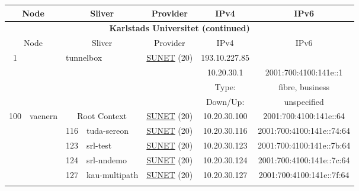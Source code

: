 \begin{small}
\begin{center}
\begin{longtable}{|c|c|c|c|c|c|c|c|}
 \multicolumn{2}{|p{8em}|}{Node} & \multicolumn{2}{|p{8em}|}{Sliver} & \multicolumn{2}{|p{8em}|}{Provider} & IPv4 & IPv6 \\ \hline
\endfirsthead
\hline
 \multicolumn{8}{|c|}{\textbf{Karlstads Universitet (continued)}} \\ \hline
 \multicolumn{2}{|p{8em}|}{Node} & \multicolumn{2}{|p{8em}|}{Sliver} & \multicolumn{2}{|p{8em}|}{Provider} & IPv4 & IPv6 \\ \hline
\endhead
 \multirow{4}{*}{\tiny{1}} & \multicolumn{3}{|c|}{\multirow{4}{*}{\tiny{tunnelbox}}} & \multicolumn{2}{|c|}{\multirow{4}{*}{\tiny{\href{http://www.sunet.se}{SUNET} (20)}}} & \tiny{193.10.227.85} & \frownie{} \\* \cline{7-7}\cline{8-8}
  & \multicolumn{3}{|c|}{} & \multicolumn{2}{|c|}{} & \tiny{10.20.30.1} & \tiny{2001:700:4100:141e::1} \\* \cline{7-7}\cline{8-8}
  & \multicolumn{3}{|c|}{} & \multicolumn{2}{|c|}{} & Type: & fibre, business \\* \cline{7-7}\cline{8-8}
  & \multicolumn{3}{|c|}{} & \multicolumn{2}{|c|}{} & Down/Up:  & unspecified \\ \hline
 \multirow{23}{*}{\tiny{100}} & \multicolumn{1}{|l|}{\multirow{23}{*}{\tiny{vaenern}}} & \multicolumn{2}{|c|}{\tiny{Root Context}} & \multicolumn{2}{|c|}{\tiny{\href{http://www.sunet.se}{SUNET} (20)}} & \tiny{10.20.30.100} & \tiny{2001:700:4100:141e::64} \\* \cline{3-3}\cline{4-4}\cline{5-5}\cline{6-6}\cline{7-7}\cline{8-8}
  &  & \tiny{116} & \multicolumn{1}{|l|}{\tiny{tuda-sereon}} & \multicolumn{2}{|c|}{\tiny{\href{http://www.sunet.se}{SUNET} (20)}} & \tiny{10.20.30.116} & \tiny{2001:700:4100:141e::74:64} \\* \cline{3-3}\cline{4-4}\cline{5-5}\cline{6-6}\cline{7-7}\cline{8-8}
  &  & \tiny{123} & \multicolumn{1}{|l|}{\tiny{srl-test}} & \multicolumn{2}{|c|}{\tiny{\href{http://www.sunet.se}{SUNET} (20)}} & \tiny{10.20.30.123} & \tiny{2001:700:4100:141e::7b:64} \\* \cline{3-3}\cline{4-4}\cline{5-5}\cline{6-6}\cline{7-7}\cline{8-8}
  &  & \tiny{124} & \multicolumn{1}{|l|}{\tiny{srl-nndemo}} & \multicolumn{2}{|c|}{\tiny{\href{http://www.sunet.se}{SUNET} (20)}} & \tiny{10.20.30.124} & \tiny{2001:700:4100:141e::7c:64} \\* \cline{3-3}\cline{4-4}\cline{5-5}\cline{6-6}\cline{7-7}\cline{8-8}
  &  & \tiny{127} & \multicolumn{1}{|l|}{\tiny{kau-multipath}} & \multicolumn{2}{|c|}{\tiny{\href{http://www.sunet.se}{SUNET} (20)}} & \tiny{10.20.30.127} & \tiny{2001:700:4100:141e::7f:64} \\* \cline{3-3}\cline{4-4}\cline{5-5}\cline{6-6}\cline{7-7}\cline{8-8}

\end{longtable}
\end{center}
\end{small}

